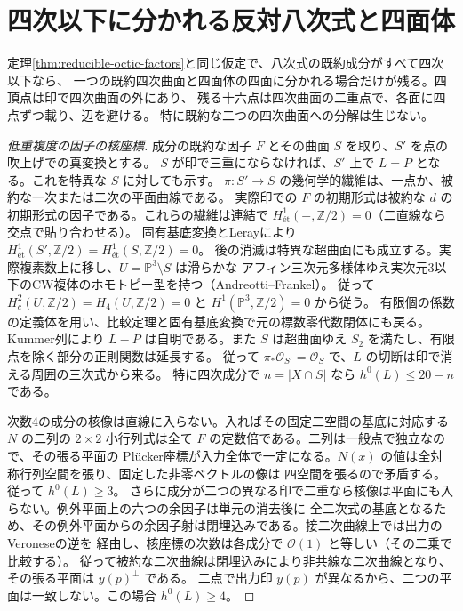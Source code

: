\section{四次以下に分かれる反対八次式と四面体}
\label{sec:quartic-octic-splitting}
\begin{theorem}\label{thm:quartic-octic-splitting}
定理\ref{thm:reducible-octic-factors}と同じ仮定で、八次式の既約成分がすべて四次以下なら、
一つの既約四次曲面と四面体の四面に分かれる場合だけが残る。四頂点は印で四次曲面の外にあり、
残る十六点は四次曲面の二重点で、各面に四点ずつ載り、辺を避ける。
特に既約な二つの四次曲面への分解は生じない。
\end{theorem}
\begin{proof}[低重複度の因子の核座標]
成分の既約な因子 $F$ とその曲面 $S$ を取り、$S'$ を点の吹上げでの真変換とする。
$S$ が印で三重にならなければ、$S'$ 上で $L=P$ となる。これを特異な $S$ に対しても示す。
$\pi:S'\to S$ の幾何学的繊維は、一点か、被約な一次または二次の平面曲線である。
実際印での $F$ の初期形式は被約な $d$ の初期形式の因子である。これらの繊維は連結で
$H^1_{\text{ét}}(-,\mathbb Z/2)=0$（二直線なら交点で貼り合わせる）。
固有基底変換とLerayにより $H^1_{\text{ét}}(S',\mathbb Z/2)=H^1_{\text{ét}}(S,\mathbb Z/2)=0$。
後の消滅は特異な超曲面にも成立する。実際複素数上に移し、$U=\mathbb P^3\setminus S$ は滑らかな
アフィン三次元多様体ゆえ実次元3以下のCW複体のホモトピー型を持つ（Andreotti--Frankel）。
従って $H^2_c(U,\mathbb Z/2)=H_4(U,\mathbb Z/2)=0$ と $H^1(\mathbb P^3,\mathbb Z/2)=0$ から従う。
有限個の係数の定義体を用い、比較定理と固有基底変換で元の標数零代数閉体にも戻る。
Kummer列により $L-P$ は自明である。また $S$ は超曲面ゆえ $S_2$ を満たし、有限点を除く部分の正則関数は延長する。
従って $\pi_*\mathcal O_{S'}=\mathcal O_S$ で、$L$ の切断は印で消える周囲の三次式から来る。
特に四次成分で $n=|X\cap S|$ なら $h^0(L)\le20-n$ である。

次数4の成分の核像は直線に入らない。入ればその固定二空間の基底に対応する $N$ の二列の
$2\times2$ 小行列式は全て $F$ の定数倍である。二列は一般点で独立なので、その張る平面の
Plücker座標が入力全体で一定になる。$N(x)$ の値は全対称行列空間を張り、固定した非零ベクトルの像は
四空間を張るので矛盾する。従って $h^0(L)\ge3$。
さらに成分が二つの異なる印で二重なら核像は平面にも入らない。例外平面上の六つの余因子は単元の消去後に
全二次式の基底となるため、その例外平面からの余因子射は閉埋込みである。接二次曲線上では出力のVeroneseの逆を
経由し、核座標の次数は各成分で $\mathcal O(1)$ と等しい（その二乗で比較する）。
従って被約な二次曲線は閉埋込みにより非共線な二次曲線となり、その張る平面は $y(p)^\perp$ である。
二点で出力印 $y(p)$ が異なるから、二つの平面は一致しない。この場合 $h^0(L)\ge4$。
\end{proof}
